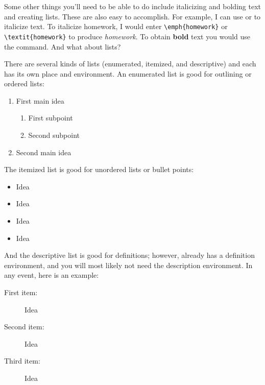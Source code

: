 Some other things you'll need to be able to do include italicizing and bolding text and creating lists. These are also easy to accomplish. For example, I can use  or  to italicize text. To italicize homework, I would enter \verb|\emph{homework}| or \verb|\textit{homework}| to produce \textit{homework}. To obtain \textbf{bold} text you would use the  command. And what about lists?

There are several kinds of lists (enumerated, itemized, and descriptive) and each has its own place and environment. An enumerated list is good for outlining or ordered lists:

\begin{singlespace}
\begin{example}
\begin{enumerate}
\item First main idea
\begin{enumerate}
\item First subpoint
\item\label{enum:1b} Second subpoint
\end{enumerate}
\item Second main idea
\end{enumerate}
\end{example}
\end{singlespace}

The itemized list is good for unordered lists or bullet points:

\begin{singlespace}
\begin{example}
\begin{itemize}
\item Idea
\item Idea
\item Idea
\item Idea
\end{itemize}
\end{example}
\end{singlespace}

And the descriptive list is good for definitions; however,  already has a definition environment, and you will most likely not need the description environment. In any event, here is an example:

\begin{singlespace}
\begin{example}
\begin{description}
\item[First item:] Idea
\item[Second item:] Idea
\item[Third item:] Idea
\end{description}
\end{example}
\end{singlespace}

